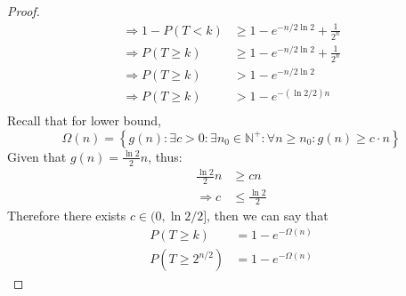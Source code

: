 \documentclass[a4paper, 12pt]{article}
\begin{document}
\begin{proof}
\begin{align*}
        \Rightarrow 1 - P(T < k) &\geq 1 - e^{-n/2\ln2} + \frac{1}{2^n}\\
        \Rightarrow P(T \geq k) &\geq 1 - e^{-n/2\ln2} + \frac{1}{2^n}\\
        \Rightarrow P(T \geq k) &> 1 - e^{-n/2\ln2}\\
        \Rightarrow P(T \geq k) &> 1 - e^{-(\ln2/2)n}\\
    \end{align*}
    Recall that for lower bound,
    \begin{equation*}
        \Omega(n) = \left\{g(n): \exists c>0: \exists n_0\in\mathbb{N}^+: \forall n\geq n_0: g(n)\geq c\cdot n\right\}
    \end{equation*}
    Given that $g(n) = \frac{\ln2}{2}n$, thus:
    \begin{align*}
        \frac{\ln2}{2}n&\geq cn\\
        \Rightarrow c&\leq\frac{\ln2}{2}
    \end{align*}
    Therefore there exists $c\in(0,\ln2/2]$, then we can say that
    \begin{align*}
        P(T \geq k) &= 1 - e^{-\Omega(n)}\\
        P(T \geq 2^{n/2}) &= 1 - e^{-\Omega(n)}
    \end{align*}
\end{proof}
\end{document}
